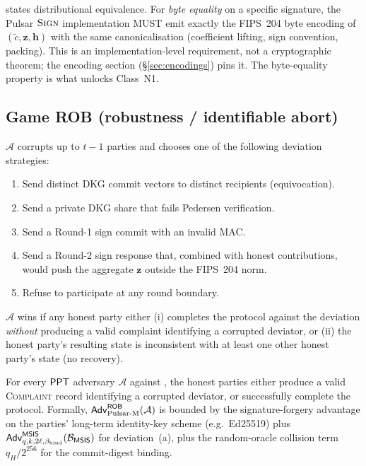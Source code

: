 \begin{remark}
 states distributional equivalence. For \emph{byte
equality} on a specific signature, the Pulsar $\textsc{Sign}$
implementation MUST emit exactly the FIPS~204 byte encoding of
$(\tilde c, \mathbf{z}, \mathbf{h})$ with the same canonicalisation
(coefficient lifting, sign convention, packing). This is an
implementation-level requirement, not a cryptographic theorem; the
encoding section (\S\ref{sec:encodings}) pins it. The byte-equality
property is what unlocks Class~N1.
\end{remark}

\subsection{Game ROB (robustness / identifiable abort)}
\label{sec:game-rob}

\begin{game}[ROB]
\label{game:rob}
$\mathcal{A}$ corrupts up to $t-1$ parties and chooses one of the
following deviation strategies:
\begin{enumerate}[label=(\alph*), leftmargin=*, itemsep=0pt]
\item Send distinct DKG commit vectors to distinct recipients (equivocation).
\item Send a private DKG share that fails Pedersen verification.
\item Send a Round-1 sign commit with an invalid MAC.
\item Send a Round-2 sign response that, combined with honest contributions, would push the aggregate $\mathbf{z}$ outside the FIPS~204 norm.
\item Refuse to participate at any round boundary.
\end{enumerate}
$\mathcal{A}$ wins if any honest party either (i) completes the
protocol against the deviation \emph{without} producing a valid
complaint identifying a corrupted deviator, or (ii) the honest
party's resulting state is inconsistent with at least one other
honest party's state (no recovery).
\end{game}

\begin{theorem}[Robustness]
\label{thm:rob}
For every $\mathsf{PPT}$ adversary $\mathcal{A}$ against , the
honest parties either produce a valid \textsc{Complaint}
record identifying a corrupted deviator, or successfully complete
the protocol. Formally,
$\mathsf{Adv}^{\mathsf{ROB}}_{\mathrm{Pulsar\text{-}M}}(\mathcal{A})$ is
bounded by the signature-forgery advantage on the parties' long-term
identity-key scheme (e.g.\ Ed25519) plus
$\mathsf{Adv}^{\mathsf{MSIS}}_{q, k, 2\ell, \beta_{\mathrm{bind}}}(\mathcal{B}_{\mathsf{MSIS}})$ for
deviation~(a),
plus the random-oracle collision term $q_H / 2^{256}$ for the
commit-digest binding.
\end{theorem}

